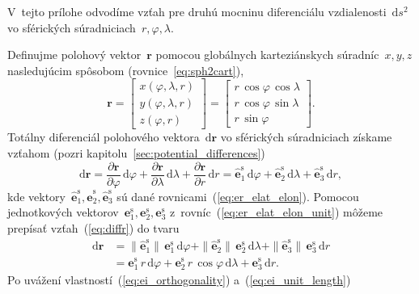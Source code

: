 \documentclass[a4paper, 12pt]{book}
\newcommand{\diff}{\mathrm d}
\let\vec\mathbf
\begin{document}
V~tejto prílohe odvodíme vzťah pre druhú mocninu diferenciálu 
vzdialenosti~$\diff s^2$ vo sférických súradniciach~$r, \varphi, \lambda$.

Definujme polohový vektor~$\vec r$ pomocou globálnych karteziánskych 
súradníc~$x, y, z$ nasledujúcim spôsobom (rovnice~\ref{eq:sph2cart}),
%
\begin{equation}
\vec r =
%
\begin{bmatrix}
x(\varphi, \lambda, r)\\
y(\varphi, \lambda, r)\\
z(\varphi, r)
\end{bmatrix}
%
=
%
\begin{bmatrix}
r \, \cos\varphi \, \cos\lambda\\
r \, \cos\varphi \, \sin\lambda\\
r \, \sin\varphi
\end{bmatrix}
%
{.}
\end{equation}
%
Totálny diferenciál polohového vektora~$\diff \vec r$ vo sférických 
súradniciach získame vzťahom (pozri kapitolu~\ref{sec:potential_differences})
%
\begin{equation}
\label{eq:diffr}
\diff \vec r = \frac{\partial \vec r}{\partial \varphi} \, \diff \varphi 
+ \frac{\partial \vec r}{\partial \lambda} \, \diff \lambda + \frac{\partial 
\vec r}{\partial r} \, \diff r = \hat{\vec e}_1^\mathrm{s} \, \diff \varphi 
+ \hat{\vec e}_2^\mathrm{s} \, \diff \lambda + \hat{\vec e}_3^\mathrm{s} \, 
\diff r{,}
\end{equation}
%
kde vektory~$\hat{\vec e}_1^\mathrm{s}, \hat{\vec e}_2^\mathrm{s}, \hat{\vec 
e}_3^\mathrm{s}$ sú dané rovnicami~(\ref{eq:er_elat_elon}).  Pomocou 
jednotkových vektorov~$\vec e_1^\mathrm{s}, \vec e_2^\mathrm{s}, \vec 
e_3^\mathrm{s}$ z~rovníc~(\ref{eq:er_elat_elon_unit}) môžeme prepísať 
vzťah~(\ref{eq:diffr}) do tvaru
%
\begin{equation}
\label{eq:diffr2}
\begin{split}
\diff \vec r &= \|\hat{\vec e}_1^\mathrm{s}\| \,\vec e_1^\mathrm{s} \, 
\diff\varphi + \|\hat{\vec e}_2^\mathrm{s}\| \, \vec e_2^\mathrm{s} \, 
\diff\lambda + \|\hat{\vec e}_3^\mathrm{s}\| \, \vec e_3^\mathrm{s} \, \diff 
r\\
%
&= \vec e_1^\mathrm{s} \, r \, \diff\varphi + \vec e_2^\mathrm{s} \, r \, 
\cos\varphi \, \diff\lambda + \vec e_3^\mathrm{s} \, \diff r{.}
\end{split}
\end{equation}
%
Po uvážení vlastností~(\ref{eq:ei_orthogonality}) a~(\ref{eq:ei_unit_length}) 
\end{document}

